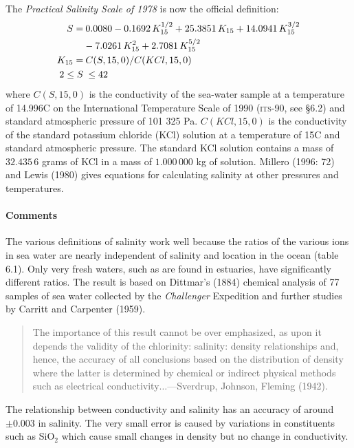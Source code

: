 The \textit{Practical Salinity Scale of 1978} is now the official definition:
\begin{subequations}
\begin{align}
S       = &\:0.0080  -0.1692\,K^{1/2}_{15} + 25.3851\,K_{15} + 14.0941\,K^{3/2}_{15} \notag \\
          &- 7.0261\,K^{2}_{15} + 2.7081\,K^{5/2}_{15} \\
K_{15}  = &\:C(S,15,0)/C(KCl,15,0) \\
2 \leq S &\:\leq 42 \notag
\end{align}
\end{subequations}
where $C(S, 15, 0)$ is the conductivity of the sea-water sample at a
temperature of 14.996\degrees C on the International Temperature Scale
of 1990 (\textsc{its}-90, see \S 6.2) and standard atmospheric
pressure of 101 325 Pa.
$C(KCl, 15, 0)$ is the conductivity of the standard potassium chloride (KCl)
solution at a temperature of 15\degrees C and standard atmospheric
pressure. The standard KCl solution contains a mass of $32.435\,6$
grams of KCl in a mass of $1.000\,000$ kg of solution. Millero (1996:
72) and Lewis (1980) gives equations for calculating salinity at other
pressures and temperatures.

\paragraph{Comments}
The various definitions of salinity work well because the ratios of
the various ions in sea water are nearly independent of salinity and
location in the ocean (table 6.1). Only very fresh waters, such as are
found in estuaries, have significantly different ratios. The result is
based on Dittmar's (1884) chemical analysis of 77 samples of sea water
collected by the \textit{Challenger} Expedition and further studies by
Carritt and Carpenter (1959).
\begin{quote} \small
The importance of this result cannot be over emphasized, as upon it
depends the validity of the chlorinity: salinity: density
relationships and, hence, the accuracy of all
conclusions based on the distribution of density where the latter is
determined by chemical or indirect physical methods such as electrical
conductivity$\ldots$---Sverdrup, Johnson, Fleming (1942).
\end{quote}
The relationship between conductivity and salinity has an
accuracy of around $\pm 0.003$ in
salinity. The very small error is caused by variations in constituents
such as SiO$_2$ which cause small changes in density but no change in
conductivity.

